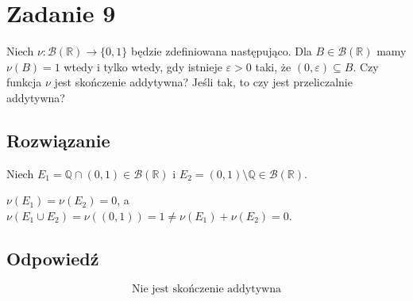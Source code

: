 \section{Zadanie 9}
Niech \(\nu : \mathcal{B}(\mathbb{R}) \to \{0,1\}\) będzie zdefiniowana następująco.
Dla \(B \in \mathcal{B}(\mathbb{R})\) mamy \(\nu(B) = 1\) wtedy i tylko wtedy, gdy istnieje \(\varepsilon > 0\) taki, że \((0,\varepsilon) \subseteq B\).
Czy funkcja \(\nu\) jest skończenie addytywna?
Jeśli tak, to czy jest przeliczalnie addytywna?
\subsection*{Rozwiązanie}

Niech \(E_1 = \mathbb{Q} \cap (0,1) \in \mathcal{B}(\mathbb{R})\) i \(E_2 = (0,1) \setminus \mathbb{Q} \in \mathcal{B}(\mathbb{R})\).

\(\nu(E_1) = \nu({E_2}) = 0\), a \(\nu(E_1 \cup E_2) = \nu( (0,1) ) = 1 \neq \nu(E_1) + \nu(E_2) = 0\).

\subsection*{Odpowiedź}
\[
	\boxed{\text{Nie jest skończenie addytywna}}
\]
